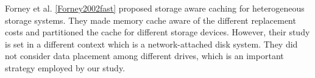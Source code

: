Forney et al. \ref{Forney2002fast} proposed storage aware caching for
heterogeneous storage systems. They made memory cache aware of the different
replacement costs and partitioned the cache for different storage devices.
However, their study is set in a different context which is a network-attached
disk system.  They did not consider data placement among different drives,
     which is an important strategy employed by our study.

